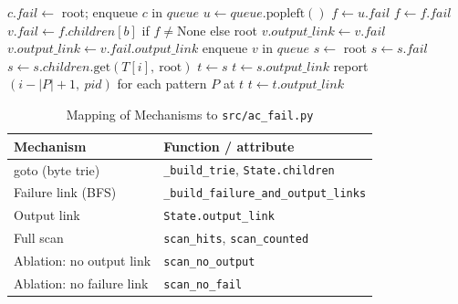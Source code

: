 \documentclass[conference]{IEEEtran}
\begin{document}
\begin{algorithm}[t]
\caption{AC link construction (BFS) and scan}
\label{alg:ac}
\begin{algorithmic}[1]
 \State $c.\mathit{fail}\gets$ root; enqueue $c$ in $\mathit{queue}$ \EndFor
{}
  \State $u\gets \mathit{queue}.\mathrm{popleft}()$
    \State $f\gets u.\mathit{fail}$
     \State $f\gets f.\mathit{fail}$ \EndWhile
    \State $v.\mathit{fail}\gets f.\mathit{children}[b]$ if $f\ne\mathrm{None}$ else root
      \State $v.\mathit{output\_link}\gets v.\mathit{fail}$
    \Else
      \State $v.\mathit{output\_link}\gets v.\mathit{fail}.\mathit{output\_link}$
    \EndIf
    \State enqueue $v$ in $\mathit{queue}$
  \EndFor
\EndWhile
\State $s\gets$ root
   \State $s\gets s.\mathit{fail}$ \EndWhile
  \State $s\gets s.\mathit{children}.\mathrm{get}(T[i],\ \text{root})$
    \State $t\gets s$
  \Else
    \State $t\gets s.\mathit{output\_link}$
  \EndIf
    \State report $(i-|P|+1,\ pid)$ for each pattern $P$ at $t$
    \State $t\gets t.\mathit{output\_link}$
  \EndWhile
\EndFor
\end{algorithmic}
\end{algorithm}

\begin{table}[t]
\caption{Mapping of Mechanisms to \texttt{src/ac\_fail.py}}
\label{tab:map}
\centering
\begin{tabular}{@{}ll@{}}
\toprule
Mechanism & Function / attribute \\
\midrule
goto (byte trie) & \texttt{\_build\_trie}, \texttt{State.children} \\
Failure link (BFS) & \texttt{\_build\_failure\_and\_output\_links} \\
Output link & \texttt{State.output\_link} \\
Full scan & \texttt{scan\_hits}, \texttt{scan\_counted} \\
Ablation: no output link & \texttt{scan\_no\_output} \\
Ablation: no failure link & \texttt{scan\_no\_fail} \\
\bottomrule
\end{tabular}
\end{table}
\end{document}
